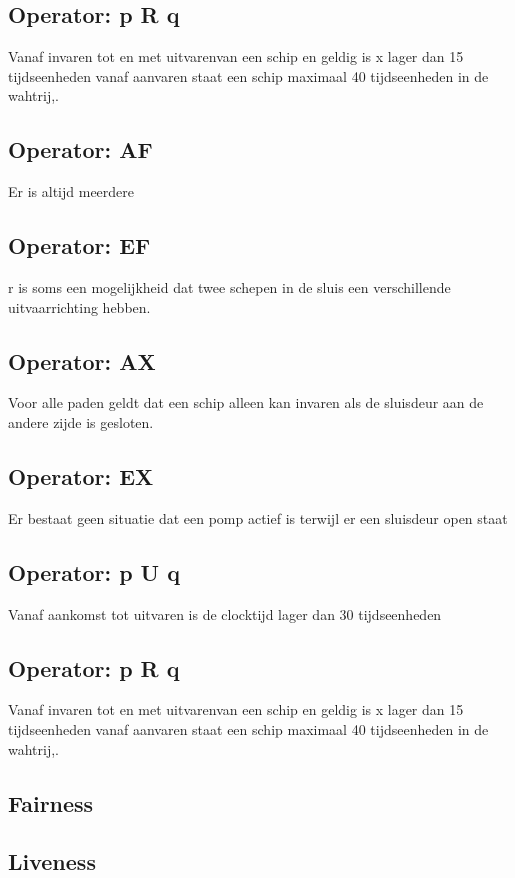 \documentclass{article}
\begin{document}
	\subsection{Operator: p R q}
	Vanaf invaren tot en met uitvarenvan een schip en geldig is x lager dan 15 tijdseenheden
	vanaf aanvaren staat een schip maximaal 40 tijdseenheden in de wahtrij,.

	\subsection{Operator: AF}
	Er is altijd meerdere
	\subsection{Operator: EF}
	r is soms een mogelijkheid dat twee schepen in de sluis een verschillende uitvaarrichting hebben.
	\subsection{Operator: AX}
	Voor alle paden geldt dat een schip alleen kan invaren als de sluisdeur aan de andere zijde is gesloten.
	\subsection{Operator: EX}
	Er bestaat geen situatie dat een pomp actief is terwijl er een sluisdeur open staat
	\subsection{Operator: p U q}
	Vanaf aankomst tot uitvaren is de clocktijd lager dan 30 tijdseenheden 
	\subsection{Operator: p R q}
	Vanaf invaren tot en met uitvarenvan een schip en geldig is x lager dan 15 tijdseenheden
	vanaf aanvaren staat een schip maximaal 40 tijdseenheden in de wahtrij,.

	\subsection{Fairness}
	
	\subsection{Liveness}
	
 
	
	\newpage
	
	
\end{document}
